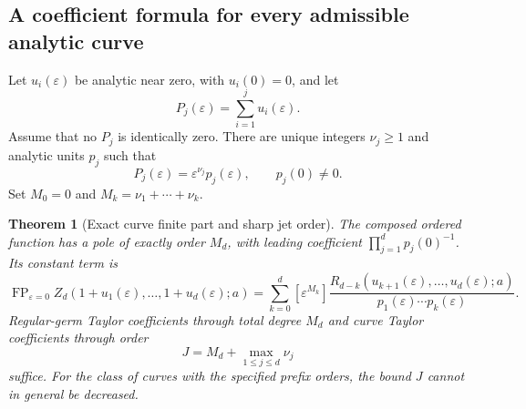\documentclass[11pt,letterpaper]{article}
\numberwithin{equation}{section}
\newtheorem{theorem}{Theorem}[section]
\theoremstyle{definition}
\theoremstyle{remark}
\DeclareMathOperator{\FP}{FP}
\newcommand{\eps}{\varepsilon}
\begin{document}
\subsection{A coefficient formula for every admissible analytic curve}

Let $u_i(\eps)$ be analytic near zero, with $u_i(0)=0$, and let
\begin{equation}\label{curve:prefix}
 P_j(\eps)=\sum_{i=1}^j u_i(\eps).
\end{equation}
Assume that no $P_j$ is identically zero. There are unique integers
$\nu_j\ge1$ and analytic units $p_j$ such that
\begin{equation}\label{curve:units}
 P_j(\eps)=\eps^{\nu_j}p_j(\eps),\qquad p_j(0)\ne0.
\end{equation}
Set $M_0=0$ and $M_k=\nu_1+\cdots+\nu_k$.

\begin{theorem}[Exact curve finite part and sharp jet order]
\label{curve:main}
The composed ordered function has a pole of exactly order $M_d$, with
leading coefficient $\prod_{j=1}^d p_j(0)^{-1}$. Its constant term is
\begin{equation}\label{curve:FP}
 \boxed{\displaystyle
 \FP_{\eps=0}Z_d(1+u_1(\eps),\ldots,1+u_d(\eps);a)
 =\sum_{k=0}^d[\eps^{M_k}]
 \frac{R_{d-k}(u_{k+1}(\eps),\ldots,u_d(\eps);a)}
      {p_1(\eps)\cdots p_k(\eps)}.}
\end{equation}
Regular-germ Taylor coefficients through total degree $M_d$ and curve
Taylor coefficients through order
\begin{equation}\label{curve:order}
 J=M_d+\max_{1\le j\le d}\nu_j
\end{equation}
suffice. For the class of curves with the specified prefix orders,
the bound $J$ cannot in general be decreased.
\end{theorem}
\end{document}
